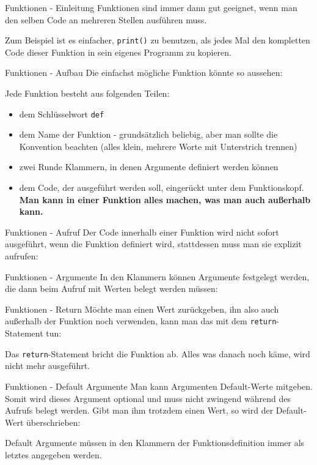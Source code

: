 \begin{frame}{Funktionen - Einleitung}
	Funktionen sind immer dann gut geeignet, wenn man den selben Code an mehreren Stellen ausführen muss.
		
	Zum Beispiel ist es einfacher, \alert{\texttt{print()}} zu benutzen, als jedes Mal den kompletten Code dieser Funktion in sein eigenes Programm zu kopieren.
\end{frame}

\begin{frame}{Funktionen - Aufbau}
	Die einfachst mögliche Funktion könnte so aussehen:
	
	\pause
	Jede Funktion besteht aus folgenden Teilen:
	\pause
	\begin{itemize}
		\item dem Schlüsselwort \alert{\texttt{def}}
		\pause
		\item dem Name der Funktion - grundsätzlich beliebig, aber man sollte  die Konvention beachten (alles klein, mehrere Worte mit Unterstrich trennen)
		\pause
		\item zwei Runde Klammern, in denen Argumente definiert werden können
		\pause
		\item dem Code, der ausgeführt werden soll, eingerückt unter dem Funktionskopf. \textbf{Man kann in einer Funktion alles machen, was man auch außerhalb kann.}
	\end{itemize}
\end{frame}

\begin{frame}{Funktionen - Aufruf}
	Der Code innerhalb einer Funktion wird nicht sofort ausgeführt, wenn die Funktion definiert wird, stattdessen muss man sie explizit aufrufen:
	
\end{frame}

\begin{frame}{Funktionen - Argumente}
	In den Klammern können Argumente festgelegt werden, die dann beim Aufruf mit Werten belegt werden müssen:
	
\end{frame}

\begin{frame}{Funktionen - Return}
	Möchte man einen Wert zurückgeben, ihn also auch außerhalb der Funktion noch verwenden, kann man das mit dem \alert{\texttt{return}}-Statement tun:
	
	Das \alert{\texttt{return}}-Statement bricht die Funktion ab. Alles was danach noch käme, wird nicht mehr ausgeführt.
\end{frame}

\begin{frame}{Funktionen - Default Argumente}
	Man kann Argumenten Default-Werte mitgeben. Somit wird dieses Argument optional und muss nicht zwingend während des Aufrufs belegt werden. Gibt man ihm trotzdem einen Wert, so wird der Default-Wert überschrieben:
	
	Default Argumente müssen in den Klammern der Funktionsdefinition immer als letztes angegeben werden.
\end{frame}


